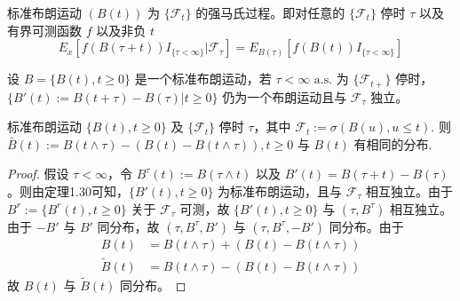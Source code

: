 \documentclass[lang=cn,10pt,thmcnt=section]{elegantbook}
\begin{document}
\begin{theorem}
	标准布朗运动 $(B(t))$ 为 $\{\mathcal{F}_t\}$ 的强马氏过程。即对任意的 $\{\mathcal{F}_t\}$ 停时 $\tau$ 以及有界可测函数 $f$ 以及非负 $t$
\[ E_x[f(B(\tau + t)) I_{\{\tau < \infty\}} | \mathcal{F}_\tau] = E_{B(\tau)}[f(B(t)) I_{\{\tau < \infty\}}] \]
\end{theorem}
\begin{theorem}
	设 $B = \{B(t), t \geq 0\}$ 是一个标准布朗运动，若 $\tau < \infty \text{ a.s.}$ 为 $\{\mathcal{F}_{t+}\}$ 停时，$\{B'(t) := B(t + \tau) - B(\tau) | t \geq 0\}$ 仍为一个布朗运动且与 $\mathcal{F}_\tau$ 独立。

\end{theorem}
\begin{theorem}
	标准布朗运动 $\{B(t), t \geq 0\}$ 及 $\{\mathcal{F}_t\}$ 停时 $\tau$，其中 $\mathcal{F}_t := \sigma(B(u), u \leq t)$. 则 $\bar{B}(t) := B(t \wedge \tau) - (B(t) - B(t \wedge \tau)), t \geq 0$ 与 $B(t)$ 有相同的分布.
\end{theorem}
\begin{proof}
	假设 $\tau < \infty$，令 $B^\tau(t) := B(\tau \wedge t)$ 以及 $B'(t) = B(\tau + t) - B(\tau)$。则由定理1.30可知，$\{B'(t), t \geq 0\}$ 为标准布朗运动，且与 $\mathcal{F}_\tau$ 相互独立。由于 $B^r := \{B^r(t), t \geq 0\}$ 关于 $\mathcal{F}_\tau$ 可测，故 $\{B'(t), t \geq 0\}$ 与 $(\tau, B^\tau)$ 相互独立。由于 $-B'$ 与 $B'$ 同分布，故 $(\tau, B^\tau, B')$ 与 $(\tau, B^\tau, -B')$ 同分布。由于
\begin{align*}
B(t) &= B(t \wedge \tau) + (B(t) - B(t \wedge \tau)) \\
\tilde{B}(t) &= B(t \wedge \tau) - (B(t) - B(t \wedge \tau))
\end{align*}
故 $B(t)$ 与 $\tilde{B}(t)$ 同分布。
\end{proof}
\end{document}
